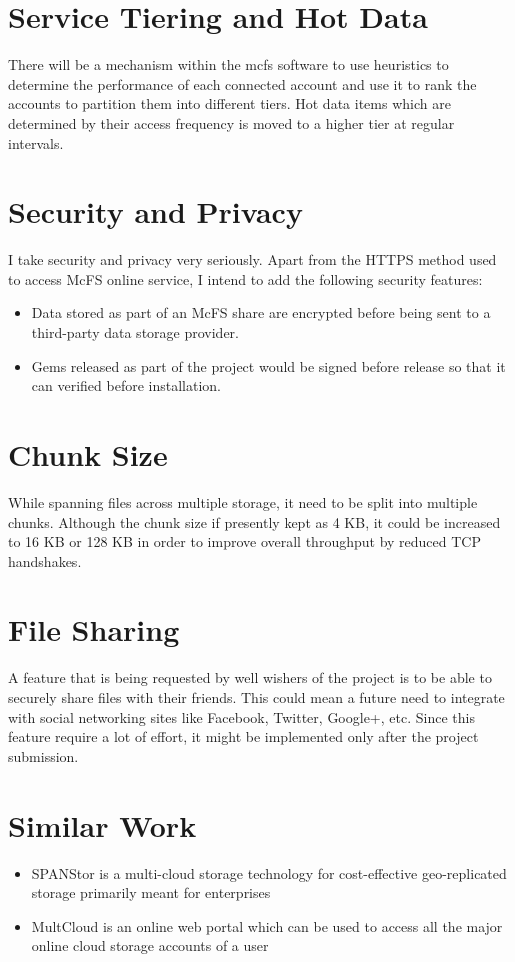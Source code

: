 \section{Service Tiering and Hot Data}
There will be a mechanism within the mcfs software to use heuristics to determine the performance of each connected account and use it to rank the accounts to partition them into different tiers. Hot data items which are determined by their access frequency is moved to a higher tier at regular intervals.
 
\section{Security and Privacy}
I take security and privacy very seriously. Apart from the HTTPS method used to access McFS online service, I intend to add the following security features:

\begin{itemize}
	\item Data stored as part of an McFS share are encrypted before being sent to a third-party data storage provider.
	\item Gems released as part of the project would be signed before release so that it can verified before installation.
\end{itemize}

\section{Chunk Size}
While spanning files across multiple storage, it need to be split into multiple chunks. Although the chunk size if presently kept as 4 KB, it could be increased to 16 KB or 128 KB in order to improve overall throughput by reduced TCP handshakes.

\section{File Sharing}
A feature that is being requested by well wishers of the project is to be able to securely share files with their friends. This could mean a future need to integrate with social networking sites like Facebook, Twitter, Google+, etc. Since this feature require a lot of effort, it might be implemented only after the project submission.

\section*{Similar Work}

\begin{itemize}
	\item SPANStor \cite{paper:spanstor} is a multi-cloud storage technology for cost-effective geo-replicated storage primarily meant for enterprises
	\item MultCloud \cite{site:multcloud} is an online web portal which can be used to access all the major online cloud storage accounts of a user
\end{itemize}
